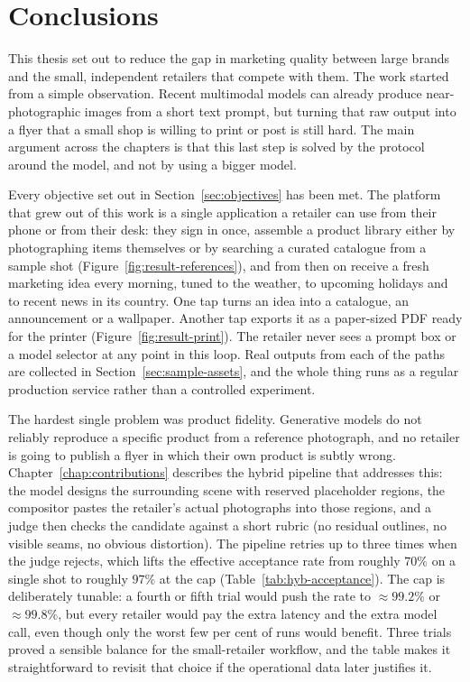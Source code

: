 \chapter{Conclusions}
\label{chap:conclusions}

This thesis set out to reduce the gap in marketing quality between large brands and the small, independent retailers that compete with them. The work started from a simple observation. Recent multimodal models can already produce near-photographic images from a short text prompt, but turning that raw output into a flyer that a small shop is willing to print or post is still hard. The main argument across the chapters is that this last step is solved by the protocol around the model, and not by using a bigger model.

Every objective set out in Section~\ref{sec:objectives} has been met. The platform that grew out of this work is a single application a retailer can use from their phone or from their desk: they sign in once, assemble a product library either by photographing items themselves or by searching a curated catalogue from a sample shot (Figure~\ref{fig:result-references}), and from then on receive a fresh marketing idea every morning, tuned to the weather, to upcoming holidays and to recent news in its country. One tap turns an idea into a catalogue, an announcement or a wallpaper. Another tap exports it as a paper-sized PDF ready for the printer (Figure~\ref{fig:result-print}). The retailer never sees a prompt box or a model selector at any point in this loop. Real outputs from each of the paths are collected in Section~\ref{sec:sample-assets}, and the whole thing runs as a regular production service rather than a controlled experiment.

The hardest single problem was product fidelity. Generative models do not reliably reproduce a specific product from a reference photograph, and no retailer is going to publish a flyer in which their own product is subtly wrong. Chapter~\ref{chap:contributions} describes the hybrid pipeline that addresses this: the model designs the surrounding scene with reserved placeholder regions, the compositor pastes the retailer's actual photographs into those regions, and a judge then checks the candidate against a short rubric (no residual outlines, no visible seams, no obvious distortion). The pipeline retries up to three times when the judge rejects, which lifts the effective acceptance rate from roughly $70\%$ on a single shot to roughly $97\%$ at the cap (Table~\ref{tab:hyb-acceptance}). The cap is deliberately tunable: a fourth or fifth trial would push the rate to $\approx 99.2\%$ or $\approx 99.8\%$, but every retailer would pay the extra latency and the extra model call, even though only the worst few per cent of runs would benefit. Three trials proved a sensible balance for the small-retailer workflow, and the table makes it straightforward to revisit that choice if the operational data later justifies it.

